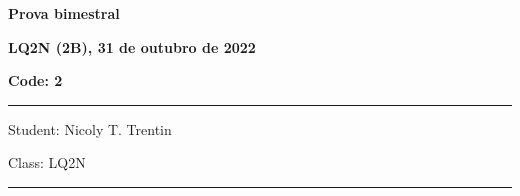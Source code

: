 \documentclass[12pt, addpoints]{exam}
\begin{document}
        \begin{minipage}[b]{0.75\linewidth}
            \begin{flushleft}
                {\bf \large Prova bimestral}
            \end{flushleft}
            \begin{flushleft}
                {\bf \large LQ2N (2B), 31 de outubro de 2022}
            \end{flushleft}
        \end{minipage}
        \begin{minipage}[b]{0.20\linewidth}
            \begin{flushright}
                {\bf \large Code: 2}
            \end{flushright}
        \end{minipage}
        \vspace{0.5cm} \hrule \vspace{0.5cm}
        \begin{minipage}{0.75\linewidth}
            \begin{flushleft}
                Student: Nicoly T. Trentin
            \end{flushleft}
        \end{minipage}
        \begin{minipage}{0.20\linewidth}
            \begin{flushright}
                Class: LQ2N
            \end{flushright}
        \end{minipage}
        \vspace{0.5cm} \hrule \vspace{0.5cm}
\end{document}
